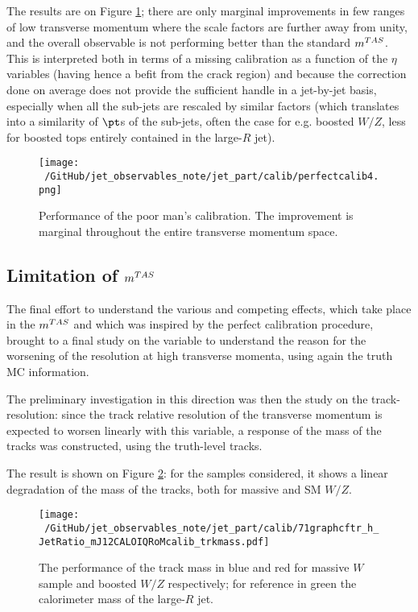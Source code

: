 The results are on Figure \ref{fig:perfcalib4}; there are only marginal improvements in few ranges of low transverse momentum where the scale factors are further away from unity, and the overall observable is not performing better than the standard $m^{TAS}$. This is interpreted both in terms of a missing calibration as a function of the $\eta$ variables (having hence a befit from the crack region) and because the correction done on average does not provide the sufficient handle in a jet-by-jet basis, especially when all the sub-jets are rescaled by similar factors (which translates into a similarity of $\pt$s of the sub-jets, often the case for e.g. boosted $W/Z$, less for boosted tops entirely contained in the large-$R$ jet).

\begin{figure}[!ht]
  \centering
      \texttt{[image: ~/GitHub/jet\_observables\_note/jet\_part/calib/perfectcalib4.png]}
  \caption[Simple calibration]{Performance of the poor man's calibration. The improvement is marginal throughout the entire transverse momentum space.}
  \label{fig:perfcalib4}
\end{figure}

\subsection{Limitation of $m^{TAS}$}
The final effort to understand the various and competing effects, which take place in the $m^{TAS}$ and which was inspired by the perfect calibration procedure, brought to a final study on the variable to understand the reason for the worsening of the resolution at high transverse momenta, using again the truth MC information.

The preliminary investigation in this direction was then the study on the track-resolution: since the track relative resolution of the transverse momentum is expected to worsen linearly with this variable, a response of the mass of the tracks was constructed, using the truth-level tracks.

The result is shown on Figure \ref{fig:trackdegrade}: for the samples considered, it shows a linear degradation of the mass of the tracks, both for massive and SM $W/Z$.

\begin{figure}[!ht]
  \centering
      \texttt{[image: ~/GitHub/jet\_observables\_note/jet\_part/calib/71graphcftr\_h\_JetRatio\_mJ12CALOIQRoMcalib\_trkmass.pdf]}
  \caption[Track mass degradation in tops and massive $W/Z$]{The performance of the track mass in blue and red for massive $W$ sample and boosted $W/Z$ respectively; for reference in green the calorimeter mass of the large-$R$ jet.}
  \label{fig:trackdegrade}
\end{figure}

